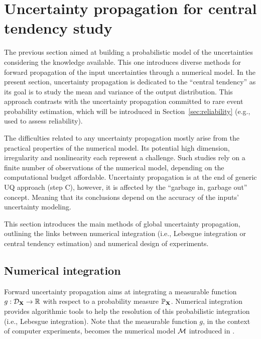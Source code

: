 \section{Uncertainty propagation for central tendency study} \label{sec:central_propagation}
The previous section aimed at building a probabilistic model of the uncertainties considering the knowledge available. 
This one introduces diverse methods for forward propagation of the input uncertainties through a numerical model. 
In the present section, uncertainty propagation is dedicated to the ``central tendency'' as its goal is to study the mean and variance of the output distribution. 
This approach contrasts with the uncertainty propagation committed to rare event probability estimation, which will be introduced in Section~\ref{sec:reliability} (e.g., used to assess reliability). 

The difficulties related to any uncertainty propagation mostly arise from the practical properties of the numerical model. 
Its potential high dimension, irregularity and nonlinearity each represent a challenge. 
Such studies rely on a finite number of observations of the numerical model, depending on the computational budget affordable.  
Uncertainty propagation is at the end of generic UQ approach (step C), however, it is affected by the ``garbage in, garbage out'' concept. 
Meaning that its conclusions depend on the accuracy of the inputs' uncertainty modeling. 

This section introduces the main methods of global uncertainty propagation, 
outlining the links between numerical integration (i.e., Lebesgue integration or central tendency estimation) and numerical design of experiments. 


\subsection{Numerical integration}
Forward uncertainty propagation aims at integrating a measurable function $g: \mathcal{D}_{{\bf X}} \rightarrow \mathbb{R}$ with respect to a probability measure $\mathbb{P}_{{\bf X}}$. 
Numerical integration provides algorithmic tools to help the resolution of this probabilistic integration (i.e., Lebesgue integration). 
Note that the measurable function $g$, in the context of computer experiments, becomes the numerical model $\mathcal{M}$ introduced in . 

